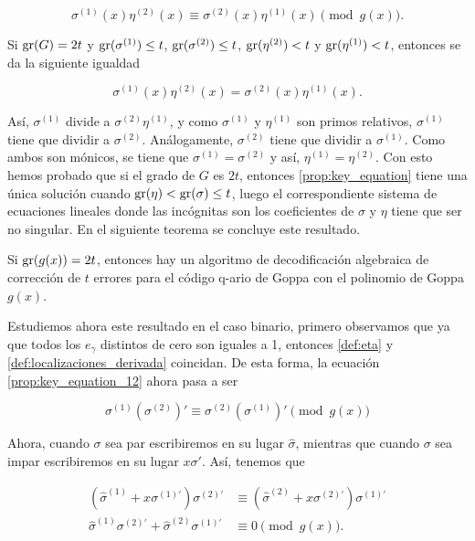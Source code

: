 \begin{equation}
    \label{prop:key_equation_12}
    \sigma^{(1)}(x) \eta^{(2)}(x) \equiv \sigma^{(2)}(x) \eta^{(1)}(x) \pmod{g(x)}.
\end{equation}

Si $\operatorname{gr}(G) = 2t$ y $\operatorname{gr}(\sigma^{(1)}) \leq t$, $\operatorname{gr}(\sigma^{(2)}) \leq t$, $\operatorname{gr}(\eta^{(2)}) < t$ y $\operatorname{gr}(\eta^{(1)}) < t$, entonces se da la siguiente igualdad

\begin{equation}
    \label{prop:key_equation_caso1}
    \sigma^{(1)}(x) \eta^{(2)}(x) = \sigma^{(2)}(x) \eta^{(1)}(x).
\end{equation}

Así, $\sigma^{(1)}$ divide a $\sigma^{(2)} \eta^{(1)}$, y como $\sigma^{(1)}$ y $\eta^{(1)}$ son primos relativos, $\sigma^{(1)}$ tiene que dividir a $\sigma^{(2)}$. Análogamente, $\sigma^{(2)}$ tiene que dividir a $\sigma^{(1)}$. Como ambos son mónicos, se tiene que $\sigma^{(1)} = \sigma^{(2)}$ y así, $\eta^{(1)} = \eta^{(2)}$. Con esto hemos probado que si el grado de $G$ es $2t$, entonces \eqref{prop:key_equation} tiene una única solución cuando $\operatorname{gr}(\eta) < \operatorname{gr}(\sigma) \leq t$, luego el correspondiente sistema de ecuaciones lineales donde las incógnitas son los coeficientes de $\sigma$ y $\eta$ tiene que ser no singular. En el siguiente teorema se concluye este resultado.

\begin{theorem}
    Si $\operatorname{gr}(g(x)) = 2t$, entonces hay un algoritmo de decodificación algebraica de corrección de $t$ errores para el código q-ario de Goppa con el polinomio de Goppa $g(x)$.
\end{theorem}

Estudiemos ahora este resultado en el caso binario, primero observamos que ya que todos los $e_\gamma$ distintos de cero son iguales a 1, entonces \eqref{def:eta} y \eqref{def:localizaciones_derivada} coincidan. De esta forma, la ecuación \eqref{prop:key_equation_12} ahora pasa a ser

$$\sigma^{(1)} \left( \sigma^{(2)} \right) ' \equiv \sigma^{(2)} \left( \sigma^{(1)} \right) ' \pmod{g(x)}$$

Ahora, cuando $\sigma$ sea par escribiremos en su lugar $\hat{\sigma}$, mientras que cuando $\sigma$ sea impar escribiremos en su lugar $x \sigma '$. Así, tenemos que

\begin{align*} 
    \left( \hat{\sigma}^{(1)} + x \sigma^{(1)'} \right) \sigma^{(2)'} &\equiv \left( \hat{\sigma}^{(2)} + x \sigma^{(2)'} \right) \sigma^{(1)'}\\ 
    \hat{\sigma}^{(1)} \sigma^{(2)'} + \hat{\sigma}^{(2)} \sigma^{(1)'} &\equiv 0 \pmod{g(x)}.
\end{align*}

